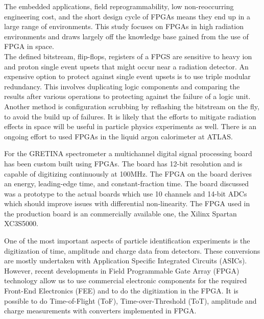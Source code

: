\documentclass[12pt]{article}
\begin{document}
\begin{doublespacing}
{\large\textbf{\cite{Wirthlin}}}

The embedded applications, field reprogrammability, low non-reoccurring engineering cost, and the short design cycle of FPGAs means they end up in a large range of environments. This study focuses on FPGAs in high radiation environments and draws largely off the knowledge base gained from the use of FPGA in space. 
\\
The defined bitstream, flip-flops, registers of a FPGS are sensitive to heavy ion and proton single event upsets that might occur near a radiation detector. An expensive option to protect against single event upsets is to use triple modular redundancy. This involves duplicating logic components and comparing the results after various operations to protecting against the failure of a logic unit. Another method is configuration scrubbing by reflashing the bitstream on the fly, to avoid the build up of failures. It is likely that the efforts to mitigate radiation effects in space will be useful in particle physics experiments as well. There is an ongoing effort to used FPGAs in the liquid argon calorimeter at ATLAS. 
\\[20pt]

{\large\textbf{\cite{Cromaz2008233}}}

For the GRETINA spectrometer a multichannel digital signal processing board has been custom built using FPGAs. The board has 12-bit resolution and is capable of digitizing continuously at 100MHz. The FPGA on the board derives an energy, leading-edge time, and constant-fraction time. The board discussed was a prototype to the actual boards which use 10 channels and 14-bit ADCs which should improve issues with differential non-linearity. The FPGA used in the production board is an commercially available one, the Xilinx Spartan XC3S5000.
\\[20pt]


{\large\textbf{\cite{Ugur}}}

One of the most important aspects of particle identification experiments is the digitization of time, amplitude and charge data from detectors. These conversions are mostly undertaken with Application Specific Integrated Circuits (ASICs). However, recent developments in Field Programmable Gate Array (FPGA) technology allow us to use commercial electronic components for the required Front-End Electronics (FEE) and to do the digitization in the FPGA. It is possible to do Time-of-Flight (ToF), Time-over-Threshold (ToT), amplitude and charge measurements with converters implemented in FPGA. 
\\[20pt]


\end{doublespacing}
\end{document}
